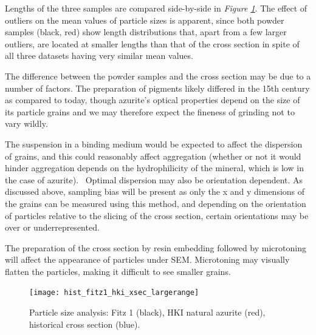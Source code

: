 Lengths of the three samples are compared side-by-side in \textit{Figure \ref{fig:hist_all}}. The effect of outliers on the mean values of particle sizes is apparent, since both powder samples (black, red) show length distributions that, apart from a few larger outliers, are located at smaller lengths than that of the cross section in spite of all three datasets having very similar mean values. 

The difference between the powder samples and the cross section may be due to a number of factors. The preparation of pigments likely differed in the 15th century as compared to today, though azurite's optical properties depend on the size of its particle grains and we may therefore expect the fineness of grinding not to vary wildly. 

The suspension in a binding medium would be expected to affect the dispersion of grains, and this could reasonably affect aggregation (whether or not it would hinder aggregation depends on the hydrophilicity of the mineral, which is low in the case of azurite).~\autocite{Zhang} Optimal dispersion may also be orientation dependent. As discussed above, sampling bias will be present as only the x and y dimensions of the grains can be measured using this method, and depending on the orientation of particles relative to the slicing of the cross section, certain orientations may be over or underrepresented. 

The preparation of the cross section by resin embedding followed by microtoning will affect the appearance of particles under SEM. Microtoning may visually flatten the particles, making it difficult to see smaller grains. 

\begin{figure}[H]
\centering
  \texttt{[image: hist\_fitz1\_hki\_xsec\_largerange]}
\caption[Particle size analysis: HKI natural azurite, Fitz 1, historical cross section]{Particle size analysis: Fitz 1 (black), HKI natural azurite (red), historical cross section (blue).} 
\label{fig:hist_all}
\end{figure}




